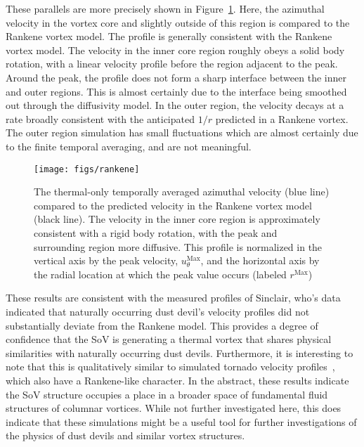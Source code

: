 These parallels are more precisely shown in
Figure~\ref{fig:rankene}. Here, the azimuthal velocity in the vortex
core and slightly outside of this region is compared to the Rankene
vortex model. The profile is generally consistent with the Rankene
vortex model. The velocity in the inner core region roughly obeys a
solid body rotation, with a linear velocity profile before the region
adjacent to the peak. Around the peak, the profile does not form a sharp
interface between the inner and outer regions. This is almost certainly
due to the interface being smoothed out through the diffusivity
model. In the outer region, the velocity decays at a rate broadly
consistent with the anticipated $1/r$ predicted in a Rankene vortex. 
The outer region simulation has small fluctuations which are 
almost certainly due to the finite temporal averaging, and are not
meaningful.  

\begin{figure}[htb]
\centering
 \texttt{[image: figs/rankene]}
 \caption{The thermal-only temporally averaged azimuthal velocity (blue
 line) compared to the predicted 
 velocity in the Rankene vortex model (black line). The velocity in the
 inner core region is approximately consistent with a rigid body
 rotation, with the peak and surrounding region more diffusive. 
 This profile is normalized in the vertical 
 axis by the peak velocity, $u_{\theta}^{\text{Max}}$, and the 
 horizontal axis by the radial location at which the peak value occurs 
 (labeled $r^{\text{Max}}$)} 
 \label{fig:rankene}  
\end{figure}

These results are consistent with the measured profiles of Sinclair,
who's data indicated that naturally occurring dust devil's velocity
profiles did not substantially deviate from the Rankene model. 
This provides a degree of confidence that the SoV is generating a
thermal vortex that shares physical similarities with naturally
occurring dust devils. Furthermore, it is interesting to note that this
is qualitatively similar to simulated tornado velocity
profiles~\cite{nolan1999structure}, which also have a Rankene-like
character. In the abstract, these results indicate 
the SoV structure occupies a place in a broader space of fundamental 
fluid structures of columnar vortices. While not further investigated
here, this does indicate that these simulations might be a useful tool
for further investigations of the physics of dust devils and similar 
vortex structures. 


